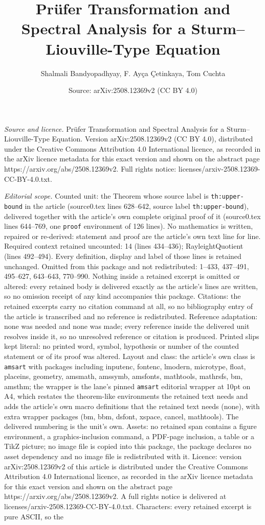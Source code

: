 \documentclass[10pt,a4paper]{amsart}
\title[Pr\"ufer Transformation and Spectral Analysis for a Sturm--L]{Pr\"ufer Transformation and Spectral Analysis for a Sturm--Liouville-Type Equation}
\author{Shalmali Bandyopadhyay, F. Ay\c{c}a \c{C}etinkaya, Tom Cuchta}
\date{Source: arXiv:2508.12369v2 (CC BY 4.0)}
\begin{document}
\maketitle

\noindent\emph{Source and licence.} Pr\"ufer Transformation and Spectral Analysis for a Sturm--Liouville-Type Equation. Version arXiv:2508.12369v2 (CC BY 4.0), distributed under the Creative Commons Attribution 4.0 International licence, as recorded in the arXiv licence metadata for this exact version and shown on the abstract page https://arxiv.org/abs/2508.12369v2. Full rights notice: licenses/arxiv-2508.12369-CC-BY-4.0.txt.\par\smallskip

\noindent\textit{Editorial scope.} Counted unit: the Theorem whose source label is \texttt{th:upper-bound} in the article (source0.tex lines 628--642, source label \texttt{th:upper-bound}), delivered together with the article's own complete original proof of it (source0.tex lines 644--769, one \texttt{proof} environment of 126 lines). No mathematics is written, repaired or re-derived: statement and proof are the article's own text line for line. Required context retained uncounted: 14 (lines 434--436); RayleightQuotient (lines 492--494). Every definition, display and label of those lines is retained unchanged. Omitted from this package and not redistributed: 1--433, 437--491, 495--627, 643--643, 770--990. Nothing inside a retained excerpt is omitted or altered: every retained body is delivered exactly as the article's lines are written, so no omission receipt of any kind accompanies this package. Citations: the retained excerpts carry no citation command at all, so no bibliography entry of the article is transcribed and no reference is redistributed. Reference adaptation: none was needed and none was made; every reference inside the delivered unit resolves inside it, so no unresolved reference or citation is produced. Printed slips kept literal: no printed word, symbol, hypothesis or number of the counted statement or of its proof was altered. Layout and class: the article's own class is \texttt{amsart} with packages including inputenc, fontenc, lmodern, microtype, float, placeins, geometry, amsmath, amssymb, amsfonts, mathtools, mathrsfs, bm, amsthm; the wrapper is the lane's pinned \texttt{amsart} editorial wrapper at 10pt on A4, which restates the theorem-like environments the retained text needs and adds the article's own macro definitions that the retained text needs (none), with extra wrapper packages (bm, bbm, dsfont, xspace, cancel, mathtools). The delivered numbering is the unit's own. Assets: no retained span contains a figure environment, a graphics-inclusion command, a PDF-page inclusion, a table or a TikZ picture; no image file is copied into this package, the package declares no asset dependency and no image file is redistributed with it. Licence: version arXiv:2508.12369v2 of this article is distributed under the Creative Commons Attribution 4.0 International licence, as recorded in the arXiv licence metadata for this exact version and shown on the abstract page https://arxiv.org/abs/2508.12369v2. A full rights notice is delivered at licenses/arxiv-2508.12369-CC-BY-4.0.txt. Characters: every retained excerpt is pure ASCII, so the 
\end{document}

